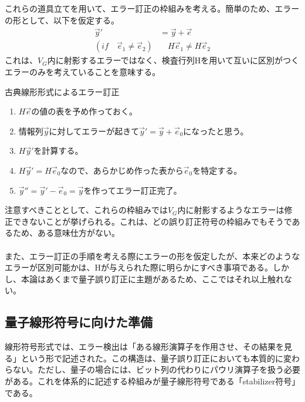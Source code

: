 \documentclass[a4paper,10.5pt]{article}
\numberwithin{equation}{section}
\begin{document}
これらの道具立てを用いて、エラー訂正の枠組みを考える。簡単のため、エラーの形として、以下を仮定する。
\begin{align*}
    \vec{y}'&=\vec{y}+\vec{e}\\
    (if\quad \vec{e}_{1}\neq \vec{e}_{2}) &\quad H\vec{e}_{1}\neq H\vec{e}_{2}
\end{align*}
これは、$V_{G}$内に射影するエラーではなく、検査行列Hを用いて互いに区別がつくエラーのみを考えていることを意味する。
\begin{setupbox}{古典線形形式によるエラー訂正}
\begin{enumerate}
    \item $H\vec{e}$の値の表を予め作っておく。
    \item 情報列$\vec{y}$に対してエラーが起きて$\vec{y}'=\vec{y}+\vec{e}_{0}$になったと思う。
    \item $H\vec{y}'$を計算する。
    \item $H\vec{y}'=H\vec{e}_{0}$なので、あらかじめ作った表から$\vec{e}_{0}$を特定する。
    \item $\vec{y}''=\vec{y}'-\vec{e}_{0}=\vec{y}$を作ってエラー訂正完了。
\end{enumerate}
\end{setupbox}
注意すべきこととして、これらの枠組みでは$V_{G}$内に射影するようなエラーは修正できないことが挙げられる。これは、どの誤り訂正符号の枠組みでもそうであるため、ある意味仕方がない。\\
\\
また、エラー訂正の手順を考える際にエラーの形を仮定したが、本来どのようなエラーが区別可能かは、Hが与えられた際に明らかにすべき事項である。しかし、本論はあくまで量子誤り訂正に主題があるため、ここではそれ以上触れない。


\subsection{量子線形符号に向けた準備}
線形符号形式では、エラー検出は「ある線形演算子を作用させ、その結果を見る」という形で記述された。この構造は、量子誤り訂正においても本質的に変わらない。ただし、量子の場合には、ビット列の代わりにパウリ演算子を扱う必要がある。これを体系的に記述する枠組みが量子線形符号である「stabilizer符号」である。
\end{document}
